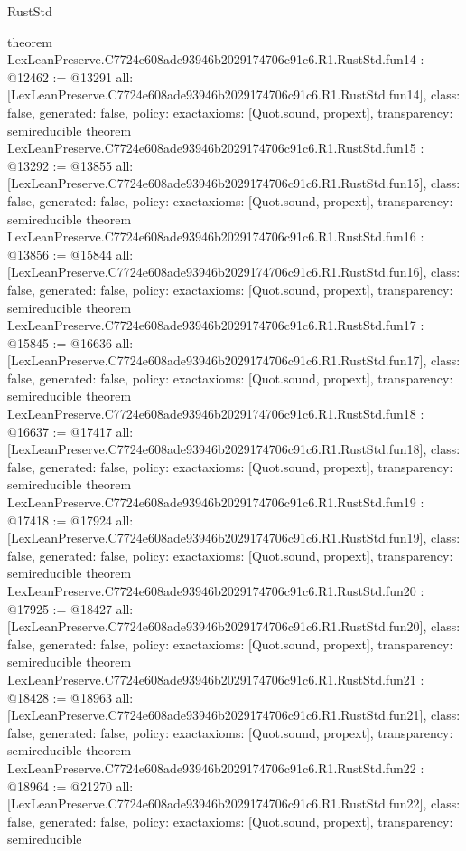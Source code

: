 \begin{lexlean}{RustStd}
\begin{coremodule}
{}
theorem LexLeanPreserve.C7724e608ade93946b2029174706c91c6.R1.RustStd.fun14 : @12462 := @13291 {
  all: [LexLeanPreserve.C7724e608ade93946b2029174706c91c6.R1.RustStd.fun14],
  class: false,
  generated: false,
  policy: exact{axioms: [Quot.sound, propext]},
  transparency: semireducible
}
theorem LexLeanPreserve.C7724e608ade93946b2029174706c91c6.R1.RustStd.fun15 : @13292 := @13855 {
  all: [LexLeanPreserve.C7724e608ade93946b2029174706c91c6.R1.RustStd.fun15],
  class: false,
  generated: false,
  policy: exact{axioms: [Quot.sound, propext]},
  transparency: semireducible
}
theorem LexLeanPreserve.C7724e608ade93946b2029174706c91c6.R1.RustStd.fun16 : @13856 := @15844 {
  all: [LexLeanPreserve.C7724e608ade93946b2029174706c91c6.R1.RustStd.fun16],
  class: false,
  generated: false,
  policy: exact{axioms: [Quot.sound, propext]},
  transparency: semireducible
}
theorem LexLeanPreserve.C7724e608ade93946b2029174706c91c6.R1.RustStd.fun17 : @15845 := @16636 {
  all: [LexLeanPreserve.C7724e608ade93946b2029174706c91c6.R1.RustStd.fun17],
  class: false,
  generated: false,
  policy: exact{axioms: [Quot.sound, propext]},
  transparency: semireducible
}
theorem LexLeanPreserve.C7724e608ade93946b2029174706c91c6.R1.RustStd.fun18 : @16637 := @17417 {
  all: [LexLeanPreserve.C7724e608ade93946b2029174706c91c6.R1.RustStd.fun18],
  class: false,
  generated: false,
  policy: exact{axioms: [Quot.sound, propext]},
  transparency: semireducible
}
theorem LexLeanPreserve.C7724e608ade93946b2029174706c91c6.R1.RustStd.fun19 : @17418 := @17924 {
  all: [LexLeanPreserve.C7724e608ade93946b2029174706c91c6.R1.RustStd.fun19],
  class: false,
  generated: false,
  policy: exact{axioms: [Quot.sound, propext]},
  transparency: semireducible
}
theorem LexLeanPreserve.C7724e608ade93946b2029174706c91c6.R1.RustStd.fun20 : @17925 := @18427 {
  all: [LexLeanPreserve.C7724e608ade93946b2029174706c91c6.R1.RustStd.fun20],
  class: false,
  generated: false,
  policy: exact{axioms: [Quot.sound, propext]},
  transparency: semireducible
}
theorem LexLeanPreserve.C7724e608ade93946b2029174706c91c6.R1.RustStd.fun21 : @18428 := @18963 {
  all: [LexLeanPreserve.C7724e608ade93946b2029174706c91c6.R1.RustStd.fun21],
  class: false,
  generated: false,
  policy: exact{axioms: [Quot.sound, propext]},
  transparency: semireducible
}
theorem LexLeanPreserve.C7724e608ade93946b2029174706c91c6.R1.RustStd.fun22 : @18964 := @21270 {
  all: [LexLeanPreserve.C7724e608ade93946b2029174706c91c6.R1.RustStd.fun22],
  class: false,
  generated: false,
  policy: exact{axioms: [Quot.sound, propext]},
  transparency: semireducible
}
\end{coremodule}
\end{lexlean}
